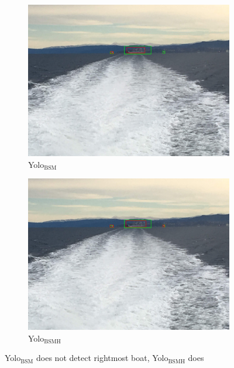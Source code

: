 \begin{figure}[h!]
\begin{subfigure}{.5\textwidth}
  \centering
  \includegraphics[width=0.8\linewidth]{results/case_buildings/yolotrf/Yolo2/IMG_2350.jpg}
  \caption{Yolo$_{\text{BSM}}$}
\end{subfigure}%
\begin{subfigure}{.5\textwidth}
  \centering
  \includegraphics[width=.8\linewidth]{results/case_buildings/yolotrf/Yolo3/IMG_2350.jpg}
  \caption{Yolo$_{\text{BSMH}}$}
\end{subfigure}
\caption{Yolo$_{\text{BSM}}$ does not detect rightmost boat, Yolo$_{\text{BSMH}}$ does}
\label{fig:Yolo3_better_trf}
\end{figure}


